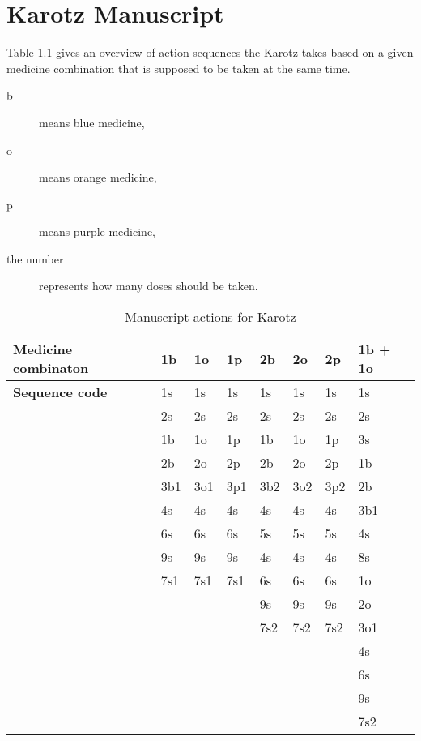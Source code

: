 \chapter{Karotz Manuscript}
\label{apx:karotzManuscript}
Table \ref{tab:karotzmanuscriptcodes} gives an overview of action sequences the Karotz takes based on a given
medicine combination that is supposed to be taken at the same time.
\begin{description}
	\item[b] means blue medicine,
	\item[o] means orange medicine,
	\item[p] means purple medicine,
	\item[the number] represents how many doses should be taken.
\end{description}

\begin{table}[ht]
	\begin{center}
		\begin{tabular}{|l|l|l|l|l|l|l|l|}
			\hline
			\bfseries{Medicine combinaton} & \bfseries{1b} & \bfseries{1o} & \bfseries{1p} & \bfseries{2b} & \bfseries{2o} & \bfseries{2p} & \bfseries{1b + 1o} \\
			\hline
			\bfseries{Sequence code} 	& 1s & 1s & 1s & 1s & 1s & 1s & 1s \\
									 	& 2s & 2s & 2s & 2s & 2s & 2s & 2s \\
									 	& 1b & 1o & 1p & 1b & 1o & 1p & 3s \\
									 	& 2b & 2o & 2p & 2b & 2o & 2p & 1b \\
									 	& 3b1& 3o1& 3p1& 3b2& 3o2& 3p2& 2b \\
									 	& 4s & 4s & 4s & 4s & 4s & 4s & 3b1\\
									 	& 6s & 6s & 6s & 5s & 5s & 5s & 4s \\
									 	& 9s & 9s & 9s & 4s & 4s & 4s & 8s \\
									 	& 7s1& 7s1& 7s1& 6s & 6s & 6s & 1o \\
									 	&    &    &    & 9s & 9s & 9s & 2o \\
									 	&    &    &    & 7s2& 7s2& 7s2& 3o1\\
									 	&    &    &    &    &    &    & 4s \\
									 	&    &    &    &    &    &    & 6s \\
									 	&    &    &    &    &    &    & 9s \\
									 	&    &    &    &    &    &    & 7s2\\
		 	\hline
		\end{tabular}
		\caption{Manuscript actions for Karotz}
		\label{tab:karotzmanuscriptcodes}
	\end{center}
\end{table}

